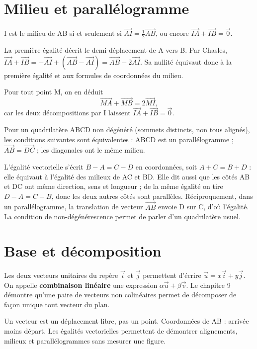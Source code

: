 \documentclass[../cours_2de.tex]{subfiles}
\begin{document}
\section{Milieu et parallélogramme}
\begin{propriete}
I est le milieu de AB si et seulement si $\overrightarrow{AI}=\frac12\overrightarrow{AB}$, ou encore $\overrightarrow{IA}+\overrightarrow{IB}=\vec0$.
\end{propriete}
\begin{demonstration}
La première égalité décrit le demi-déplacement de A vers B. Par Chasles,
$\overrightarrow{IA}+\overrightarrow{IB}
=-\overrightarrow{AI}+(\overrightarrow{AB}-\overrightarrow{AI})
=\overrightarrow{AB}-2\overrightarrow{AI}$.
Sa nullité équivaut donc à la première égalité et aux formules de coordonnées du milieu.
\end{demonstration}
Pour tout point M, on en déduit
\[
\overrightarrow{MA}+\overrightarrow{MB}
=2\overrightarrow{MI},
\]
car les deux décompositions par I laissent $\overrightarrow{IA}+\overrightarrow{IB}=\vec0$.

Pour un quadrilatère ABCD non dégénéré (sommets distincts, non tous alignés), les conditions suivantes sont équivalentes : ABCD est un parallélogramme ; $\overrightarrow{AB}=\overrightarrow{DC}$ ; les diagonales ont le même milieu.
\begin{demonstration}
L'égalité vectorielle s'écrit $B-A=C-D$ en coordonnées, soit $A+C=B+D$ : elle équivaut à l'égalité des milieux de AC et BD. Elle dit aussi que les côtés AB et DC ont même direction, sens et longueur ; de la même égalité on tire $D-A=C-B$, donc les deux autres côtés sont parallèles. Réciproquement, dans un parallélogramme, la translation de vecteur $\overrightarrow{AB}$ envoie D sur C, d'où l'égalité. La condition de non-dégénérescence permet de parler d'un quadrilatère usuel.
\end{demonstration}
\section{Base et décomposition}
Les deux vecteurs unitaires du repère $\vec i$ et $\vec j$ permettent d'écrire $\vec u=x\vec i+y\vec j$. On appelle \textbf{combinaison linéaire} une expression $\alpha\vec u+\beta\vec v$. Le chapitre 9 démontre qu'une paire de vecteurs non colinéaires permet de décomposer de façon unique tout vecteur du plan.
\begin{retenir}
Un vecteur est un déplacement libre, pas un point. Coordonnées de AB : arrivée moins départ. Les égalités vectorielles permettent de démontrer alignements, milieux et parallélogrammes sans mesurer une figure.
\end{retenir}
\end{document}
